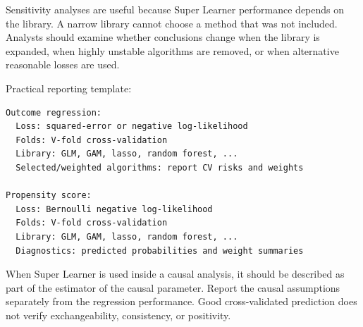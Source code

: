 Sensitivity analyses are useful because Super Learner performance depends on the
library. A narrow library cannot choose a method that was not included. Analysts
should examine whether conclusions change when the library is expanded, when
highly unstable algorithms are removed, or when alternative reasonable losses are
used.

\begin{implementationbox}
Practical reporting template:
\begin{lstlisting}
Outcome regression:
  Loss: squared-error or negative log-likelihood
  Folds: V-fold cross-validation
  Library: GLM, GAM, lasso, random forest, ...
  Selected/weighted algorithms: report CV risks and weights

Propensity score:
  Loss: Bernoulli negative log-likelihood
  Folds: V-fold cross-validation
  Library: GLM, GAM, lasso, random forest, ...
  Diagnostics: predicted probabilities and weight summaries
\end{lstlisting}
\end{implementationbox}

\begin{estimationbox}
When Super Learner is used inside a causal analysis, it should be described as part
of the estimator of the causal parameter. Report the causal assumptions separately
from the regression performance. Good cross-validated prediction does not verify
exchangeability, consistency, or positivity.
\end{estimationbox}
